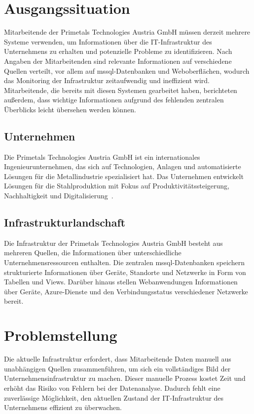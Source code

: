 \section{Ausgangssituation}

Mitarbeitende der Primetals Technologies Austria GmbH müssen derzeit mehrere
Systeme verwenden, um Informationen über die IT-Infrastruktur des Unternehmens
zu erhalten und potenzielle Probleme zu identifizieren. Nach Angaben der
Mitarbeitenden sind relevante Informationen auf verschiedene Quellen verteilt,
vor allem auf \gls{mssql}-Datenbanken und Weboberflächen, wodurch das Monitoring
der Infrastruktur zeitaufwendig und ineffizient wird. Mitarbeitende, die bereits
mit diesen Systemen gearbeitet haben, berichteten außerdem, dass wichtige
Informationen aufgrund des fehlenden zentralen Überblicks leicht übersehen werden
können.

\subsection{Unternehmen}

Die Primetals Technologies Austria GmbH ist ein internationales
Ingenieurunternehmen, das sich auf Technologien, Anlagen und automatisierte
Lösungen für die Metallindustrie spezialisiert hat. Das Unternehmen entwickelt
Lösungen für die Stahlproduktion mit Fokus auf Produktivitätssteigerung,
Nachhaltigkeit und Digitalisierung~\cite{primetals2026}.

\subsection{Infrastrukturlandschaft}

Die Infrastruktur der Primetals Technologies Austria GmbH besteht aus mehreren
Quellen, die Informationen über unterschiedliche Unternehmensressourcen
enthalten. Die zentralen \gls{mssql}-Datenbanken speichern strukturierte
Informationen über Geräte, Standorte und Netzwerke in Form von Tabellen und
Views. Darüber hinaus stellen Webanwendungen Informationen über Geräte,
Azure-Dienste und den Verbindungsstatus verschiedener Netzwerke bereit.

\section{Problemstellung}

Die aktuelle Infrastruktur erfordert, dass Mitarbeitende Daten manuell aus
unabhängigen Quellen zusammenführen, um sich ein vollständiges Bild der
Unternehmensinfrastruktur zu machen. Dieser manuelle Prozess kostet Zeit und
erhöht das Risiko von Fehlern bei der Datenanalyse. Dadurch fehlt eine
zuverlässige Möglichkeit, den aktuellen Zustand der IT-Infrastruktur des
Unternehmens effizient zu überwachen.

